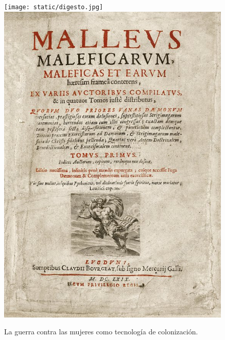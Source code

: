 \documentclass[a4paper,10pt]{book}
\newif\ifes
\newcommand{\es}[1]{\ifes#1\fi}
\begin{document}
\es{Durante esa etapa, las instituciones heredades del Imperio Romano de Occidente comenzaron a competir con las comunidades indígenas locales y la Iglesia Católica produce una serie de importantes tecnologías de colonización~\cite{zaffaroni2013-cuestionCriminal}.}%
%
\begin{figure}[ht!]
    \centering
    \texttt{[image: static/digesto.jpg]}
    \includegraphics[width=0.21\linewidth]{static/malleus.jpeg}
    \caption{La guerra contra las mujeres como tecnología de colonización. %
    }
    \label{fig:malleus}
\end{figure}
%
\es{La primera acción importante es la intervención en las relaciones comunitaria de reproducción, regulando las relaciones familiares y sexuales.}%
%
\es{Al proscribir la acción política del espacio doméstico,  núcleo fundamental de toda tecnología de sociabilidad comunitaria administrada principalmente por las mujeres, se debilita el arraigo comunitario, facilitando la captación de población desertora para actividades militares.}%
%
\es{El poder punitivo se fue extendiendo y un nuevo sistema penal re-nació de los llamados \emph{libris terribilis} del Digesto, antiguas leyes romanas recolectadas por encargo del emperador Justiniano de Constantinopla y re-interpretadas de modo de liberar el poder punitivo de todo límite.}%
%
\es{La guerra contra las mujeres se formaliza definitivamente con la publicación del \emph{Malleus maleficarum} en 1484, que fue el segundo best seller más impreso después de la Biblia durante los siguientes 200 años.}%
%
\es{El sujeto masculino se torna modelo de lo humano y de todo cuanto sea dotado de politicidad, interés general y valor universal, y el espacio de las mujeres se transforma en margen y resto de la política.}%

%
\end{document}

